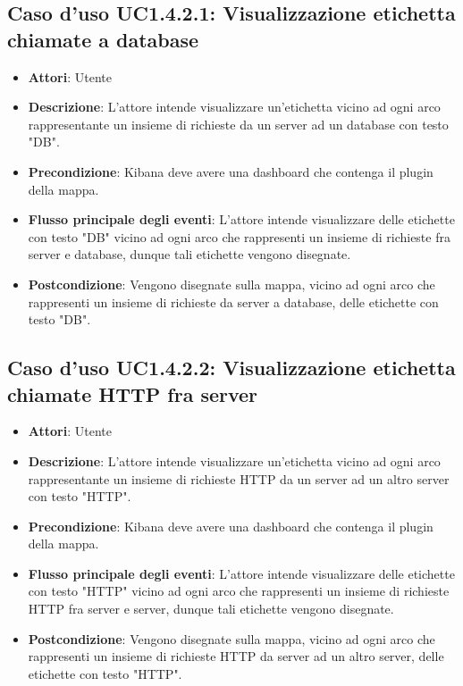 \subsection{Caso d'uso UC1.4.2.1: Visualizzazione etichetta chiamate a database}
\begin{itemize}
	\item \textbf{Attori}: Utente
	\item \textbf{Descrizione}: L'attore intende visualizzare un'etichetta vicino ad ogni arco rappresentante un insieme di richieste da un server ad un database con testo "DB".
	\item \textbf{Precondizione}: Kibana deve avere una dashboard che contenga il plugin della mappa.
	
	\item \textbf{Flusso principale degli eventi}: L'attore intende visualizzare delle etichette con testo "DB" vicino ad ogni arco che rappresenti un insieme di richieste fra server e database, dunque tali etichette vengono disegnate.
	\item \textbf{Postcondizione}: Vengono disegnate sulla mappa, vicino ad ogni arco che rappresenti un insieme di richieste da server a database, delle etichette con testo "DB".
\end{itemize}
\subsection{Caso d'uso UC1.4.2.2: Visualizzazione etichetta chiamate HTTP fra server}
\begin{itemize}
	\item \textbf{Attori}: Utente
	\item \textbf{Descrizione}: L'attore intende visualizzare un'etichetta vicino ad ogni arco rappresentante un insieme di richieste HTTP da un server ad un altro server con testo "HTTP".
	\item \textbf{Precondizione}: Kibana deve avere una dashboard che contenga il plugin della mappa.
	\item \textbf{Flusso principale degli eventi}: L'attore intende visualizzare delle etichette con testo "HTTP" vicino ad ogni arco che rappresenti un insieme di richieste HTTP fra server e server, dunque tali etichette vengono disegnate.
	\item \textbf{Postcondizione}: Vengono disegnate sulla mappa, vicino ad ogni arco che rappresenti un insieme di richieste HTTP da server ad un altro server, delle etichette con testo "HTTP".
	
\end{itemize}
